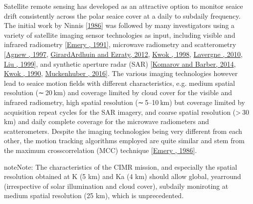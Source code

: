 \documentclass[letterpaper,10pt,english]{jupyterBook}
\begin{document}
\sphinxAtStartPar
Satellite remote sensing has developed as an attractive option to monitor sea\sphinxhyphen{}ice drift consistently across the polar sea\sphinxhyphen{}ice cover at a daily to sub\sphinxhyphen{}daily frequency.
The initial work by Ninnis  {[}\hyperlink{cite.references:id25}{1986}{]} was followed by many investigators using a variety of satellite imaging sensor technologies as input, including visible and infrared radiometry {[}\hyperlink{cite.references:id6}{Emery , 1991}{]},
microwave radiometry and scatterometry {[}\hyperlink{cite.references:id2}{Agnew , 1997}, \hyperlink{cite.references:id7}{Girard\sphinxhyphen{}Ardhuin and Ezraty, 2012}, \hyperlink{cite.references:id14}{Kwok , 1998}, \hyperlink{cite.references:id19}{Lavergne , 2010}, \hyperlink{cite.references:id22}{Liu , 1999}{]},
and synthetic aperture radar (SAR) {[}\hyperlink{cite.references:id11}{Komarov and Barber, 2014}, \hyperlink{cite.references:id13}{Kwok , 1990}, \hyperlink{cite.references:id23}{Muckenhuber , 2016}{]}. The various imaging technologies however lead to sea\sphinxhyphen{}ice motion fields with different characteristics, e.g.
medium spatial resolution (∼ 20 km) and coverage limited by cloud cover for the visible and infrared radiometry, high spatial resolution (∼ 5–10 km) but coverage limited by acquisition repeat cycles for the SAR imagery,
and coarse spatial resolution (> 30 km) and daily complete coverage for the microwave radiometers and scatterometers. Despite the imaging technologies being very different from each other, the motion tracking algorithms
employed are quite similar and stem from the maximum cross\sphinxhyphen{}correlation (MCC) technique {[}\hyperlink{cite.references:id4}{Emery , 1986}{]}.

\begin{sphinxadmonition}{note}{Note:}
\sphinxAtStartPar
The characteristics of the CIMR mission, and especially the spatial resolution obtained at K (5 km)
and Ka (4 km) should allow global, year\sphinxhyphen{}round (irrespective of solar illumination and cloud cover), sub\sphinxhyphen{}daily moniroting at medium spatial resolution (25 km), which is unprecedented.
\end{sphinxadmonition}
\end{document}
